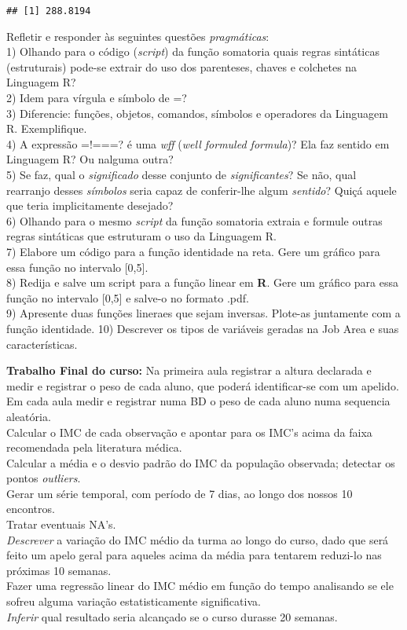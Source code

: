 \documentclass[]{article}
\begin{document}
\begin{verbatim}
## [1] 288.8194
\end{verbatim}

Refletir e responder às seguintes questões \emph{pragmáticas}:\\
1) Olhando para o código (\emph{script}) da função somatoria quais
regras sintáticas (estruturais) pode-se extrair do uso dos parenteses,
chaves e colchetes na Linguagem R?\\
2) Idem para vírgula e símbolo de =?\\
3) Diferencie: funções, objetos, comandos, símbolos e operadores da
Linguagem R. Exemplifique.\\
4) A expressão =!===? é uma \emph{wff} (\emph{well formuled formula})?
Ela faz sentido em Linguagem R? Ou nalguma outra?\\
5) Se faz, qual o \emph{significado} desse conjunto de
\emph{significantes}? Se não, qual rearranjo desses \emph{símbolos}
seria capaz de conferir-lhe algum \emph{sentido}? Quiçá aquele que teria
implicitamente desejado?\\
6) Olhando para o mesmo \emph{script} da função somatoria extraia e
formule outras regras sintáticas que estruturam o uso da Linguagem R.\\
7) Elabore um código para a função identidade na reta. Gere um gráfico
para essa função no intervalo {[}0,5{]}.\\
8) Redija e salve um script para a função linear em \textbf{R}. Gere um
gráfico para essa função no intervalo {[}0,5{]} e salve-o no formato
.pdf.\\
9) Apresente duas funções lineraes que sejam inversas. Plote-as
juntamente com a função identidade. 10) Descrever os tipos de variáveis
geradas na Job Area e suas características.

\textbf{Trabalho Final do curso: } Na primeira aula registrar a altura
declarada e medir e registrar o peso de cada aluno, que poderá
identificar-se com um apelido.\\
Em cada aula medir e registrar numa BD o peso de cada aluno numa
sequencia aleatória.\\
Calcular o IMC de cada observação e apontar para os IMC's acima da faixa
recomendada pela literatura médica.\\
Calcular a média e o desvio padrão do IMC da população observada;
detectar os pontos \emph{outliers}.\\
Gerar um série temporal, com período de 7 dias, ao longo dos nossos 10
encontros.\\
Tratar eventuais NA's.\\
\emph{Descrever} a variação do IMC médio da turma ao longo do curso,
dado que será feito um apelo geral para aqueles acima da média para
tentarem reduzi-lo nas próximas 10 semanas.\\
Fazer uma regressão linear do IMC médio em função do tempo analisando se
ele sofreu alguma variação estatisticamente significativa.\\
\emph{Inferir} qual resultado seria alcançado se o curso durasse 20
semanas.
\end{document}
